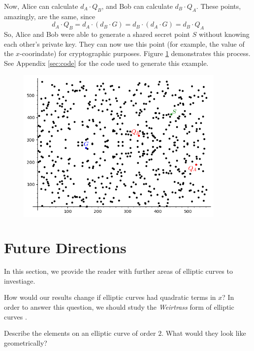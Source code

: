 \documentclass[]{../../math_paper}
\begin{document}
Now, Alice can calculate $d_A \cdot Q_B$, and Bob can calculate $d_B \cdot Q_A$. These points, amazingly, are the same, since $$d_A \cdot Q_B = d_A \cdot (d_B \cdot G) = d_B \cdot (d_A \cdot G) = d_B \cdot Q_A$$
So, Alice and Bob were able to generate a shared secret point $S$ without knowing each other's private key. They can now use this point (for example, the value of the $x$-coorindate) for cryptographic purposes. Figure \ref{fig:crypto} demonstrates this process. See Appendix \ref{sec:code} for the code used to generate this example.

\begin{figure}[h]
    \centering
    \includegraphics[height= 3in]{media/crypto.png}
    \label{fig:crypto}
\end{figure}
\section{Future Directions} \label{sec:future}
In this section, we provide the reader with further areas of elliptic curves to investiage.

\begin{question}
    How would our results change if elliptic curves had quadratic terms in $x$? In order to answer this question, we should study the \emph{Weirtrass} form of elliptic curves \cite{cassels_1991}.
\end{question}
\begin{question}
    Describe the elements on an elliptic curve of order $2$. What would they look like geometrically?
\end{question}


\appendix
\end{document}
